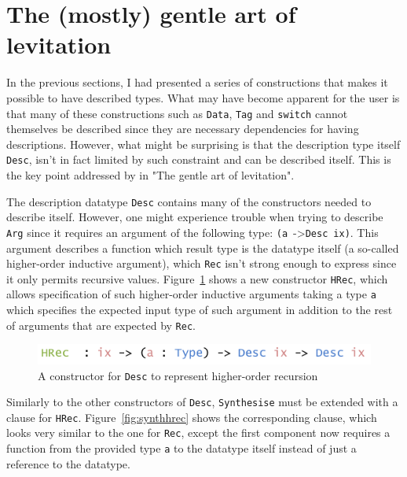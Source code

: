 \documentclass{ituthesis}
\newcommand{\ttconstructor}[1]{\textcolor{constructor-color}{\texttt{#1}}}
\newcommand{\tttype}[1]{\textcolor{type-color}{\texttt{#1}}}
\newcommand{\ttdec}[1]{\textcolor{declared-var-color}{\texttt{#1}}}
\newcommand{\ttvar}[1]{\textcolor{local-var-color}{\texttt{#1}}}
\begin{document}
\section{The (mostly) gentle art of levitation}
\label{sec:TheMostlyGentleArtofLevitation}
In the previous sections, I had presented a series of constructions that makes it possible to have described types.
What may have become apparent for the user is that many of these constructions such as \tttype{Data}, \tttype{Tag} and \ttdec{switch} cannot themselves be described since
they are necessary dependencies for having descriptions.
However, what might be surprising is that the description type itself \tttype{Desc}, isn't in fact limited by such constraint
and can be described itself.
This is the key point addressed by \cite{Chapman:2010:GAL:1863543.1863547} in "The gentle art of levitation".

The description datatype \tttype{Desc} contains many of the constructors needed to describe itself.
However, one might experience trouble when trying to describe \ttconstructor{Arg} since it requires an argument of the following type:
\texttt{(}\ttvar{a}~->\tttype{Desc}~\ttvar{ix}\texttt{)}.
This argument describes a function which result type is the datatype itself (a so-called higher-order inductive argument), which \ttconstructor{Rec} isn't strong enough to express since it only permits recursive values.
Figure~\ref{fig:deschrec} shows a new constructor \ttconstructor{HRec}, which allows specification of such higher-order inductive arguments taking a type \ttvar{a} which specifies
the expected input type of such argument in addition to the rest of arguments that are expected by \ttconstructor{Rec}.

\begin{figure}[ht]
\begin{center}
    \includegraphics[scale=0.5]{Figures/ADescriptionForDatatypesExtended.png}
\end{center}
\caption{A constructor for \tttype{Desc} to represent higher-order recursion}
\label{fig:deschrec}
\end{figure}

Similarly to the other constructors of \tttype{Desc}, \ttdec{Synthesise} must be extended with a clause for \ttconstructor{HRec}. Figure~\ref{fig:synthhrec} shows the corresponding clause,
which looks very similar to the one for \ttconstructor{Rec}, except the first component now requires a function from the provided type \ttvar{a} to the datatype itself instead of just a reference
to the datatype.
\end{document}
